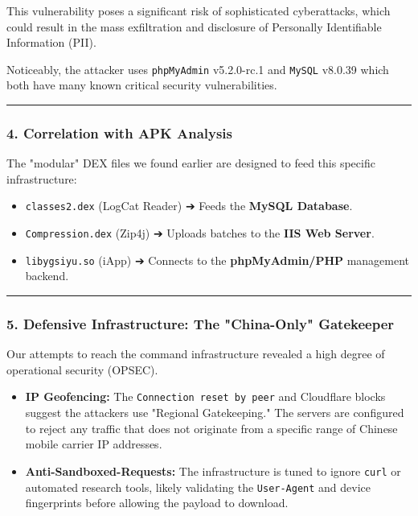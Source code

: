 \documentclass[
]{article}
\begin{document}
This vulnerability poses a significant risk of sophisticated
cyberattacks, which could result in the mass exfiltration and disclosure
of Personally Identifiable Information (PII).

Noticeably, the attacker uses \texttt{phpMyAdmin} v5.2.0-rc.1 and
\texttt{MySQL} v8.0.39 which both have many known critical security
vulnerabilities.

\begin{center}\rule{0.5\linewidth}{0.5pt}\end{center}

\subsubsection{4. Correlation with APK
Analysis}\label{4-correlation-with-apk-analysis-2}

The "modular" DEX files we found earlier are designed to feed this
specific infrastructure:

\begin{itemize}
\item
  \texttt{classes2.dex} (LogCat Reader) ➔ Feeds the \textbf{MySQL
  Database}.
\item
  \texttt{Compression.dex} (Zip4j) ➔ Uploads batches to the \textbf{IIS
  Web Server}.
\item
  \texttt{libygsiyu.so} (iApp) ➔ Connects to the \textbf{phpMyAdmin/PHP}
  management backend.
\end{itemize}

\begin{center}\rule{0.5\linewidth}{0.5pt}\end{center}

\subsubsection{5. Defensive Infrastructure: The "China-Only"
Gatekeeper}\label{5-defensive-infrastructure-the-china-only-gatekeeper-2}

Our attempts to reach the command infrastructure revealed a high degree
of operational security (OPSEC).

\begin{itemize}
\item
  \textbf{IP Geofencing:} The \texttt{Connection\ reset\ by\ peer} and
  Cloudflare blocks suggest the attackers use "Regional Gatekeeping."
  The servers are configured to reject any traffic that does not
  originate from a specific range of Chinese mobile carrier IP
  addresses.
\item
  \textbf{Anti-Sandboxed-Requests:} The infrastructure is tuned to
  ignore \texttt{curl} or automated research tools, likely validating
  the \texttt{User-Agent} and device fingerprints before allowing the
  payload to download.
\end{itemize}
\end{document}
